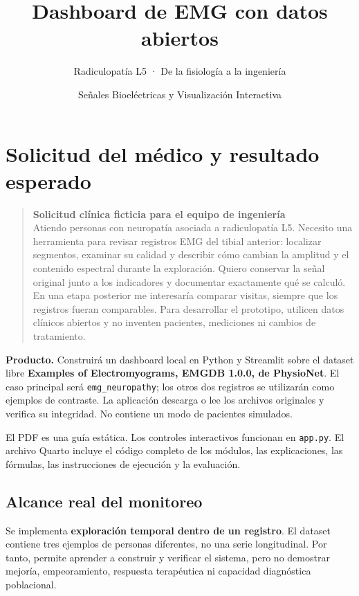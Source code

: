 \documentclass[
  spanish,
  10.5pt,
  a4paper,
  DIV=11,
  numbers=noendperiod]{scrartcl}
\title{Dashboard de EMG con datos abiertos}
\subtitle{Radiculopatía L5 · De la fisiología a la ingeniería}
\author{Señales Bioeléctricas y Visualización Interactiva}
\date{}
\renewcommand*\contentsname{Tabla de contenidos}
\newcommand\contentsname{Tabla de contenidos}
\begin{document}
\maketitle

\renewcommand*\contentsname{Tabla de contenidos}
{
\setcounter{tocdepth}{1}
\tableofcontents
}

\newpage

\section{Solicitud del médico y resultado
esperado}\label{solicitud-del-muxe9dico-y-resultado-esperado}

\begin{quote}
\textbf{Solicitud clínica ficticia para el equipo de ingeniería}\\
Atiendo personas con neuropatía asociada a radiculopatía L5. Necesito
una herramienta para revisar registros EMG del tibial anterior:
localizar segmentos, examinar su calidad y describir cómo cambian la
amplitud y el contenido espectral durante la exploración. Quiero
conservar la señal original junto a los indicadores y documentar
exactamente qué se calculó. En una etapa posterior me interesaría
comparar visitas, siempre que los registros fueran comparables. Para
desarrollar el prototipo, utilicen datos clínicos abiertos y no inventen
pacientes, mediciones ni cambios de tratamiento.
\end{quote}

\textbf{Producto.} Construirá un dashboard local en Python y Streamlit
sobre el dataset libre \textbf{Examples of Electromyograms, EMGDB 1.0.0,
de PhysioNet}. El caso principal será \texttt{emg\_neuropathy}; los
otros dos registros se utilizarán como ejemplos de contraste. La
aplicación descarga o lee los archivos originales y verifica su
integridad. No contiene un modo de pacientes simulados.

El PDF es una guía estática. Los controles interactivos funcionan en
\texttt{app.py}. El archivo Quarto incluye el código completo de los
módulos, las explicaciones, las fórmulas, las instrucciones de ejecución
y la evaluación.

\subsection{Alcance real del
monitoreo}\label{alcance-real-del-monitoreo}

Se implementa \textbf{exploración temporal dentro de un registro}. El
dataset contiene tres ejemplos de personas diferentes, no una serie
longitudinal. Por tanto, permite aprender a construir y verificar el
sistema, pero no demostrar mejoría, empeoramiento, respuesta terapéutica
ni capacidad diagnóstica poblacional.
\end{document}
